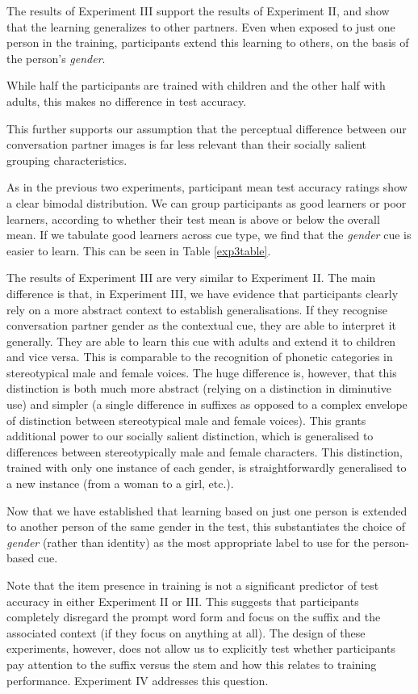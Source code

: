 \documentclass{frontiersSCNS} %
\begin{document}
The results of Experiment III support the results of Experiment II, and show that the learning generalizes to other partners.  Even when exposed to just one person in the training, participants extend this learning to others, on the basis of the person's \emph{gender}.

While half the participants are trained with children and the other half with adults, this makes no difference in test accuracy. 


This further supports our assumption that the perceptual difference between our conversation partner images is far less relevant than their socially salient grouping characteristics.


As in the previous two experiments, participant mean test accuracy ratings show a clear bimodal distribution. We can group participants as good learners or poor learners, according to whether their test mean is above or below the overall mean. If we tabulate good learners across cue type, we find that the \emph{gender} cue is easier to learn. This can be seen in Table \ref{exp3table}. 

The results of Experiment III are very similar to Experiment II. The main difference is that, in Experiment III, we have evidence that participants clearly rely on a more abstract context to establish generalisations. If they recognise conversation partner gender as the contextual cue, they are able to interpret it generally. They are able to learn this cue with adults and extend it to children and vice versa. This is comparable to the recognition of phonetic categories in stereotypical male and female voices. The huge difference is, however, that this distinction is both much more abstract (relying on a distinction in diminutive use) and simpler (a single difference in suffixes as opposed to a complex envelope of distinction between stereotypical male and female voices). This grants additional power to our socially salient distinction, which is generalised to differences between stereotypically male and female characters. This distinction, trained with only one instance of each gender, is straightforwardly generalised to a new instance (from a woman to a girl, etc.).


Now that we have established that learning based on just one person is extended to another person of the same gender in the test, this substantiates the choice of \emph{gender} (rather than identity) as the most appropriate label to use for the person-based cue.


Note that the item presence in training is not a significant predictor of test accuracy in either Experiment II or III. This suggests that participants completely disregard the prompt word form and focus on the suffix and the associated context (if they focus on anything at all). 
The design of these experiments, however, does not allow us to explicitly test whether participants pay attention to the suffix versus the stem and how this relates to training performance. Experiment IV addresses this question.  
\end{document}
